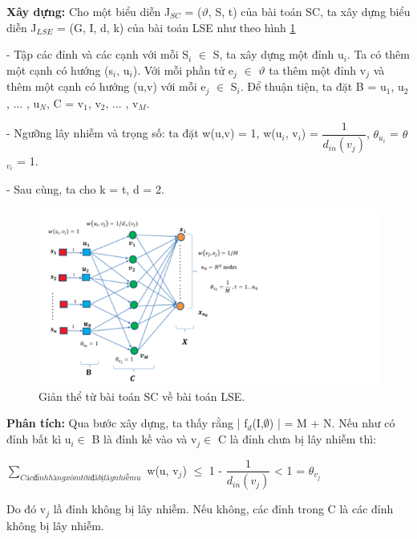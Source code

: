  		{\bfseries Xây dựng:} Cho một biểu diễn J$_{SC}$ = ($\vartheta$, S, t) của bài toán SC, ta xây dựng biểu diễn J$_{LSE}$ = (G, I, d, k) của bài toán LSE như theo hình \ref{refhinh3_3}
 		
 		- Tập các đỉnh và các cạnh với mỗi S$_{i}$ $\in$ S, ta xây dựng một đỉnh u$_{i}$. Ta có thêm một cạnh có hướng (s$_{i}$, u$_{i}$). Với mỗi phần tử e$_{j}$ $\in$ $\vartheta$ ta thêm một đỉnh v$_{j}$ và thêm một cạnh có hướng (u,v) với mỗi e$_{j}$ $\in$ S$_{i}$. Để thuận tiện, ta đặt B = {u$_{1}$, u$_{2}$, ... , u$_{N}$}, C = {v$_{1}$, v$_{2}$, ... , v$_{M}$}.
 		
 		- Ngưỡng lây nhiễm và trọng số: ta đặt w(u,v) = 1, w(u$_{i}$, v$_{i}$) = $\dfrac{1}{d_{in}(v_{j})}$, $\theta$$_{u_{i}}$ = $\theta$$_{v_{i}}$ = 1.
 		
 		- Sau cùng, ta cho k = t, d = 2. 		
 		
 		\begin{center}
 			\begin{figure}[!htp]
 				\begin{center}
 					\includegraphics [scale=.5]{picture/Hinh3_3}
 				\end{center}
 				\caption{Giản thể từ bài toán SC về bài toán LSE.}
 				\label{refhinh3_3}
 			\end{figure}
 		\end{center}
 		
 		{\bfseries Phân tích:} Qua bước xây dựng, ta thấy rằng | f$_{d}$(I,$\emptyset$) | = M + N. Nếu như có đỉnh bất kì u$_{i} \in$ B là đỉnh kề vào và v$_{j} \in$ C là đỉnh chưa bị lây nhiễm thì: 
 		\begin{center}
 			$\sum_{Các đỉnh hàng xóm tới đã bị lây nhiễm u}$ w(u, v$_{j}$) $\leq$ 1 - $\dfrac{1}{d_{in}(v_{j})}$ < 1 = $\theta_{v_{j}}$
 		\end{center}
 		
 		Do đó v$_{j}$ lầ đỉnh không bị lây nhiễm. Nếu không, các đỉnh trong C là các đỉnh không bị lây nhiễm.
 		
